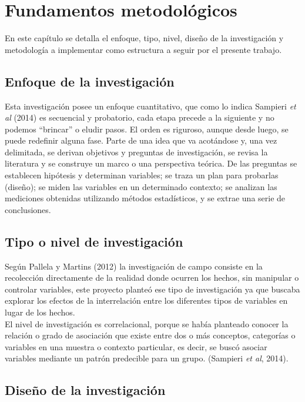 \chapter{Fundamentos metodológicos}

	En este capítulo se detalla el enfoque, tipo, nivel, diseño de la investigación y metodología a implementar como estructura a seguir por el presente trabajo.

\section{Enfoque de la investigación}

	Esta investigación posee un enfoque cuantitativo, que como lo indica Sampieri \textit{et al} (2014) es secuencial y
	probatorio, cada etapa precede a la siguiente y no podemos “brincar” o eludir pasos. El orden es riguroso,
	aunque desde luego, se puede redefinir alguna fase. Parte de una idea que va acotándose y, una vez delimitada,
	se derivan objetivos y preguntas de investigación, se revisa la literatura y se construye un marco o una perspectiva
	teórica. De las preguntas se establecen hipótesis y determinan variables; se traza un plan para probarlas (diseño);
	se miden las variables en un determinado contexto; se analizan las mediciones obtenidas utilizando métodos estadísticos,
	y se extrae una serie de conclusiones.\\


\section{Tipo o nivel de investigaci\'on}

Según Pallela y Martins (2012) la investigación de campo consiste en la recolección directamente de la realidad donde ocurren los hechos, sin manipular o controlar variables, este proyecto planteó ese tipo de investigación ya que buscaba explorar los efectos de la interrelación entre los diferentes tipos de variables en lugar de los hechos.\\

El nivel de investigación es correlacional, porque se había planteado conocer la relación o grado de asociación que existe entre dos o más conceptos, categorías o variables en una muestra o contexto particular, es decir, se buscó asociar variables mediante un patrón predecible para un grupo. (Sampieri \textit{et al}, 2014).


\section{Dise\~no de la investigaci\'on}


